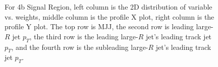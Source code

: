 \begin{figure}[htbp!]
\begin{center}
\caption{For 4b Signal Region, left column is the 2D distribution of variable vs. weights, middle column is the profile X plot, right column is the profile Y plot. The top row is MJJ, the second row is leading large-$R$ jet $p_{T}$, the third row is the leading large-$R$ jet's leading track jet $p_{T}$, and the fourth row is the subleading large-$R$ jet's leading track jet $p_{T}$.}
\label{fig:app-reweight-dist-4b-SR}
\end{center}
\end{figure}


